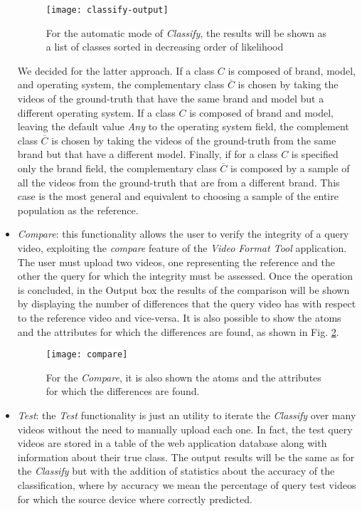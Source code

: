 \begin{itemize}
\begin{figure}
  \centering
  \texttt{[image: classify-output]}
  \caption{For the automatic mode of \emph{Classify}, the results will be shown as a list of classes sorted in decreasing order of likelihood}\label{fig:classify-output}
\end{figure}

We decided for the latter approach.
If a class $C$ is composed of brand, model, and operating system, the complementary class $\overline{C}$ is chosen by taking the videos of the ground-truth that have the same brand and model but a different operating system.
If a class $C$ is composed of brand and model, leaving the default value \emph{Any} to the operating system field, the complement class $\overline{C}$ is chosen by taking the videos of the ground-truth from the same brand but that have a different model.
Finally, if for a class $C$  is specified only the brand field, the complementary class $\overline{C}$ is composed by a sample of all the videos from the ground-truth that are from a different brand. This case is the most general and equivalent to choosing a sample of the entire population as the reference.

\item \emph{Compare}: this functionality allows the user to verify the integrity of a query video, exploiting the \emph{compare} feature of the \emph{Video Format Tool} application. The user must upload two videos, one representing the reference and the other the query for which the integrity must be assessed. Once the operation is concluded, in the Output box the results of the comparison will be shown by displaying the number of differences that the query video has with respect to the reference video and vice-versa. It is also possible to show the atoms and the attributes for which the differences are found, as shown in Fig. \ref{fig:compare}.

\begin{figure}
  \centering
  \texttt{[image: compare]}
  \caption{For the \emph{Compare}, it is also shown the atoms and the attributes for which the differences are found.}\label{fig:compare}
\end{figure}

\item \emph{Test}: the \emph{Test} functionality is just an utility to iterate the \emph{Classify} over many videos without the need to manually upload each one. In fact, the test query videos are stored in a table of the web application database along with information about their true class. The output results will be the same as for the \emph{Classify} but with the addition of statistics about the accuracy of the classification, where by accuracy we mean the percentage of query test videos for which the source device where correctly predicted.

\end{itemize}


